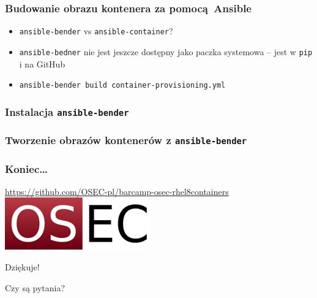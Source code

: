 \documentclass[dvipsnames,table]{beamer}
\begin{document}
\begin{frame}[fragile]
	\frametitle{Budowanie obrazu kontenera za pomocą Ansible}
%	
\begin{itemize}
	\item {\tt ansible-bender} vs {\tt ansible-container}?
	\item {\tt ansible-bedner} nie jest jeszcze dostępny jako paczka systemowa -- jest w {\tt pip} i na GitHub
	\item {\tt ansible-bender build container-provisioning.yml}
\end{itemize}
\end{frame}





%

\begin{frame}[fragile]
	\frametitle{Instalacja {\tt ansible-bender}}
	
\end{frame}

\begin{frame}[fragile]
	\frametitle{Tworzenie obrazów kontenerów z {\tt ansible-bender}}
	
\end{frame}

\begin{frame}
\frametitle{Koniec\ldots}
\begin{center}
\href{https://github.com/OSEC-pl/barcamp-osec-rhel8containers}{https://github.com/OSEC-pl/barcamp-osec-rhel8containers}
\includegraphics[scale=0.5]{img-oseclogo.png}

Dziękuje!

Czy są pytania?

\end{center}
\end{frame}
\end{document}
